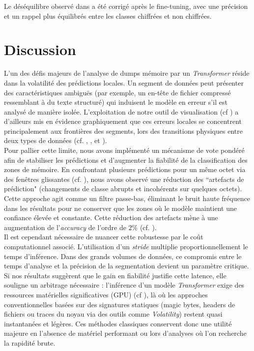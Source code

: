 \documentclass[12pt]{report}
\begin{document}
    Le déséquilibre observé dans  a été corrigé après le fine-tuning, avec une précision et un rappel plus équilibrés entre les classes chiffrées et non chiffrées. 

    \chapter{Discussion}\label{chap:discussion}
    L'un des défis majeurs de l'analyse de dumps mémoire par un \textit{Transformer} réside dans la volatilité des prédictions locales. Un segment de données peut présenter des caractéristiques ambiguës (par exemple, un en-tête de fichier compressé ressemblant à du texte structuré) qui induisent le modèle en erreur s'il est analysé de manière isolée. L'exploitation de notre outil de visualisation (cf ) a d'ailleurs mis en évidence graphiquement que ces erreurs locales se concentrent principalement aux frontières des segments, lors des transitions physiques entre deux types de données (cf. , ,  et ).\\

    Pour pallier cette limite, nous avons implémenté un mécanisme de vote pondéré afin de stabiliser les prédictions et d'augmenter la fiabilité de la classification des zones de mémoire. En confrontant plusieurs prédictions pour un même octet via des fenêtres glissantes (cf. ), nous avons observé une réduction des “artefacts de prédiction" (changements de classe abrupts et incohérents sur quelques octets). Cette approche agit comme un filtre passe-bas, éliminant le bruit haute fréquence dans les résultats pour ne conserver que les zones où le modèle maintient une confiance élevée et constante. Cette réduction des artefacts mène à une augmentation de l'\textit{accuracy} de l'ordre de $2\%$ (cf. ).\\

    Il est cependant nécessaire de nuancer cette robustesse par le coût computationnel associé. L'utilisation d'un \textit{stride} multiplie proportionnellement le temps d'inférence. Dans des grands volumes de données, ce compromis entre le temps d'analyse et la précision de la segmentation devient un paramètre critique. Si nos résultats suggèrent que le gain en fiabilité justifie cette latence, elle souligne un arbitrage nécessaire : l'inférence d'un modèle \textit{Transformer} exige des ressources matérielles significatives (GPU) (cf ), là où les approches conventionnelles basées sur des signatures statiques (magic bytes, headers de fichiers ou traces du noyau via des outils comme \textit{Volatility}) restent quasi instantanées et légères. Ces méthodes classiques conservent donc une utilité majeure en l'absence de matériel performant ou lors d'analyses où l'on recherche la rapidité brute.\\
\end{document}
